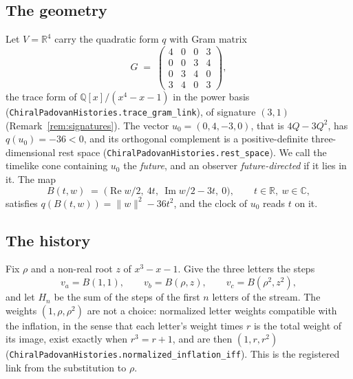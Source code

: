 \documentclass[11pt]{amsart}
\theoremstyle{plain}
\theoremstyle{definition}
\theoremstyle{remark}
\begin{document}
\subsection{The geometry}

Let $V = \mathbb{R}^4$ carry the quadratic form $q$ with Gram matrix
\[
  G \;=\; \begin{pmatrix} 4 & 0 & 0 & 3 \\ 0 & 0 & 3 & 4 \\ 0 & 3 & 4 & 0 \\ 3 & 4 & 0 & 3 \end{pmatrix},
\]
the trace form of $\mathbb{Q}[x]/(x^4 - x - 1)$ in the power basis
(\texttt{ChiralPadovanHistories.trace\_gram\_link}), of signature $(3,1)$
(Remark~\ref{rem:signatures}). The vector $u_0 = (0, 4, -3, 0)$, that is $4Q - 3Q^2$, has
$q(u_0) = -36 < 0$, and its orthogonal complement is a positive-definite three-dimensional
rest space (\texttt{ChiralPadovanHistories.rest\_space}). We call the timelike cone containing
$u_0$ the \emph{future}, and an observer \emph{future-directed} if it lies in it. The map
\[
  B(t, w) \;=\; \bigl(\operatorname{Re} w/2,\ 4t,\ \operatorname{Im} w/2 - 3t,\ 0\bigr),
  \qquad t \in \mathbb{R},\ w \in \mathbb{C},
\]
satisfies $q(B(t,w)) = \lVert w \rVert^2 - 36 t^2$, and the clock of $u_0$ reads $t$ on it.

\subsection{The history}

Fix $\rho$ and a non-real root $z$ of $x^3 - x - 1$. Give the three letters the steps
\[
  v_a = B(1, 1), \qquad v_b = B(\rho, z), \qquad v_c = B(\rho^2, z^2),
\]
and let $H_n$ be the sum of the steps of the first $n$ letters of the stream. The weights
$(1, \rho, \rho^2)$ are not a choice: normalized letter weights compatible with the
inflation, in the sense that each letter's weight times $r$ is the total weight of its image,
exist exactly when $r^3 = r + 1$, and are then $(1, r, r^2)$
(\texttt{ChiralPadovanHistories.normalized\_inflation\_iff}). This is the registered link from
the substitution to $\rho$.
\end{document}
